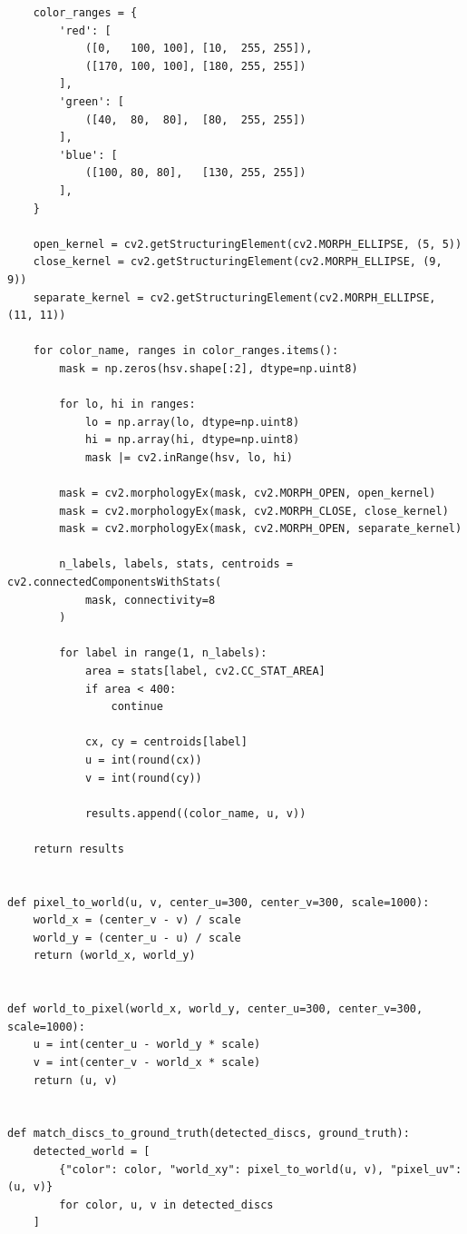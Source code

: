 \documentclass{article}
\begin{document}
\begin{latin}
\begin{LTR}
\begin{verbatim}
    color_ranges = {
        'red': [
            ([0,   100, 100], [10,  255, 255]),
            ([170, 100, 100], [180, 255, 255])
        ],
        'green': [
            ([40,  80,  80],  [80,  255, 255])
        ],
        'blue': [
            ([100, 80, 80],   [130, 255, 255])
        ],
    }
    
    open_kernel = cv2.getStructuringElement(cv2.MORPH_ELLIPSE, (5, 5))
    close_kernel = cv2.getStructuringElement(cv2.MORPH_ELLIPSE, (9, 9))
    separate_kernel = cv2.getStructuringElement(cv2.MORPH_ELLIPSE, (11, 11))
    
    for color_name, ranges in color_ranges.items():
        mask = np.zeros(hsv.shape[:2], dtype=np.uint8)
        
        for lo, hi in ranges:
            lo = np.array(lo, dtype=np.uint8)
            hi = np.array(hi, dtype=np.uint8)
            mask |= cv2.inRange(hsv, lo, hi)
        
        mask = cv2.morphologyEx(mask, cv2.MORPH_OPEN, open_kernel)
        mask = cv2.morphologyEx(mask, cv2.MORPH_CLOSE, close_kernel)
        mask = cv2.morphologyEx(mask, cv2.MORPH_OPEN, separate_kernel)
        
        n_labels, labels, stats, centroids = cv2.connectedComponentsWithStats(
            mask, connectivity=8
        )
        
        for label in range(1, n_labels):
            area = stats[label, cv2.CC_STAT_AREA]
            if area < 400:
                continue
            
            cx, cy = centroids[label]
            u = int(round(cx))
            v = int(round(cy))
            
            results.append((color_name, u, v))
    
    return results


def pixel_to_world(u, v, center_u=300, center_v=300, scale=1000):
    world_x = (center_v - v) / scale
    world_y = (center_u - u) / scale
    return (world_x, world_y)


def world_to_pixel(world_x, world_y, center_u=300, center_v=300, scale=1000):
    u = int(center_u - world_y * scale)
    v = int(center_v - world_x * scale)
    return (u, v)


def match_discs_to_ground_truth(detected_discs, ground_truth):
    detected_world = [
        {"color": color, "world_xy": pixel_to_world(u, v), "pixel_uv": (u, v)}
        for color, u, v in detected_discs
    ]
    

\end{verbatim}
\end{LTR}
\end{latin}
\end{document}
